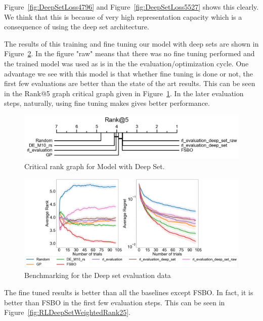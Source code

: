 \documentclass[12pt, twoside, ngerman]{report}
\begin{document}
Figure~\ref{fig:DeepSetLoss4796} and Figure~\ref{fig:DeepSetLoss5527} shows this clearly.
We think that this is because of very high representation capacity which is a consequence of using the deep set architecture.

The results of this training and fine tuning our model with deep sets are shown in Figure~\ref{fig:RLDeepSetevaluation}.
In the figure "raw" means that there was no fine tuning performed and the trained model was used as is in the the evaluation/optimization cycle.
One advantage we see with this model is that whether fine tuning is done or not,  the first few evaluations are better than the state of the art results.
This can be seen in the Rank@5 graph critical graph given in Figure~\ref{fig:DeepSetRank5}.
In the later evaluation steps, naturally,  using fine tuning makes gives better performance.

\begin{figure}[h]
  \centering
    \includegraphics[scale=0.35]{images/DeepSetRank5}
    \caption{Critical rank graph for Model with Deep Set.}
    \label{fig:DeepSetRank5}
\end{figure}

\begin{figure}[h]
  \centering
    \includegraphics[scale=0.20]{images/RLDeepSetevaluation}
    \caption{Benchmarking for the Deep set evaluation data}
    \label{fig:RLDeepSetevaluation}
\end{figure}
\fi

\iffalse
The fine tuned results is better than all the baselines except FSBO.
In fact,  it is better than FSBO in the first few evaluation steps.
This can be seen in Figure~\ref{fig:RLDeepSetWeightedRank25}.
\end{document}

